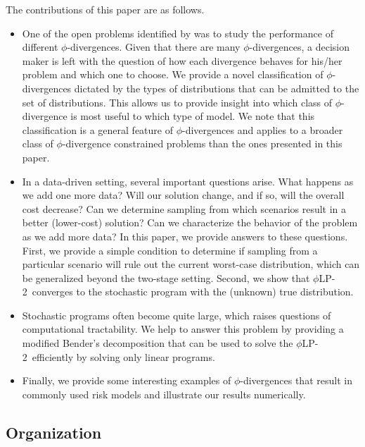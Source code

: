 \documentclass[opre,nonblindrev]{informs3} %
\newcommand{\plp}{$\phi$LP-2}
\begin{document}
The contributions of this paper are as follows. 
\begin{itemize}
	\item One of the open problems identified by \cite{bental2011robust} was to study the performance of different $\phi$-divergences.
		Given that there are many $\phi$-divergences, a decision maker is left with the question of how each divergence behaves for his/her problem and which one to choose.
		We provide a novel classification of $\phi$-divergences dictated by the types of distributions that can be admitted to the set of distributions. 
		This allows us to provide insight into which class of $\phi$-divergence is most useful to which type of model.
		We note that this classification is a general feature of $\phi$-divergences and applies to a broader class of $\phi$-divergence constrained problems than the ones presented in this paper. 
		
	\item In a data-driven setting, several important questions arise.
		What happens as we add one more data?
		Will our solution change, and if so, will the overall cost decrease?
		Can we determine sampling from which scenarios result in a better (lower-cost) solution?
		Can we characterize the behavior of the problem as we add more data?
		In this paper, we provide answers to these questions.
		First, we provide a simple condition to determine if sampling from a particular scenario will rule out the current worst-case distribution, which can be generalized beyond the two-stage setting.
		Second, we show that \plp\ converges to the stochastic program with the (unknown) true distribution.
		
	\item Stochastic programs often become quite large, which raises questions of computational tractability.
		We help to answer this problem by providing a modified Bender's decomposition that can be used to solve the \plp\ efficiently by solving only linear programs. 

	\item Finally, we provide some interesting examples of $\phi$-divergences that result in commonly used risk models and illustrate our results numerically. 
\end{itemize}

\subsection{Organization}
\end{document}
